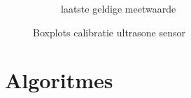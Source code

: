 \documentclass[tt3]{penoverslag}
\begin{document}
\begin{figure}
\begin{subfigure}[h]{0.31\textwidth}
                \caption{laatste geldige meetwaarde}
        \end{subfigure}
 \caption{Boxplots calibratie ultrasone sensor}
\label{fig:calibUS}
\end{figure}



\section{Algoritmes} %
\label{sec:algo}
%
\end{document}
